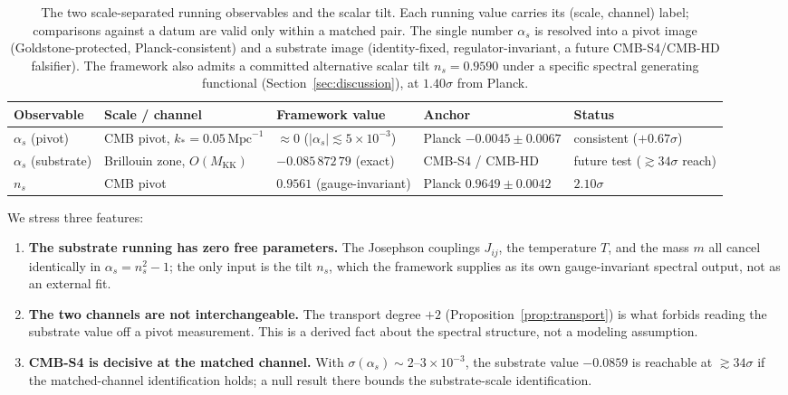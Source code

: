 \documentclass[12pt]{article}
\theoremstyle{definition}
\theoremstyle{remark}
\begin{document}
\begin{table}[h]
\centering
\small
\begin{tabular}{@{}l >{\raggedright\arraybackslash}p{2.9cm} >{\raggedright\arraybackslash}p{3.3cm} >{\raggedright\arraybackslash}p{2.7cm} >{\raggedright\arraybackslash}p{2.4cm}@{}}
\toprule
Observable & Scale / channel & Framework value & Anchor & Status \\
\midrule
$\alpha_s$ (pivot) & CMB pivot, $k_*=0.05\,\mathrm{Mpc}^{-1}$ & $\approx 0$ ($|\alpha_s|\lesssim 5\times10^{-3}$) & Planck $-0.0045 \pm 0.0067$ & consistent ($+0.67\sigma$) \\
$\alpha_s$ (substrate) & Brillouin zone, $O(M_{\mathrm{KK}})$ & $-0.085\,872\,79$ (exact) & CMB-S4 / CMB-HD & future test ($\gtrsim 34\sigma$ reach) \\
$n_s$ & CMB pivot & $0.9561$ (gauge-invariant) & Planck $0.9649 \pm 0.0042$ & $2.10\sigma$ \\
\bottomrule
\end{tabular}
\caption{The two scale-separated running observables and the scalar tilt. Each running value carries its (scale, channel) label; comparisons against a datum are valid only within a matched pair. The single number $\alpha_s$ is resolved into a pivot image (Goldstone-protected, Planck-consistent) and a substrate image (identity-fixed, regulator-invariant, a future CMB-S4/CMB-HD falsifier). The framework also admits a committed alternative scalar tilt $n_s = 0.9590$ under a specific spectral generating functional (Section~\ref{sec:discussion}), at $1.40\sigma$ from Planck.}
\label{tab:two-channel}
\end{table}

We stress three features:

\begin{enumerate}
  \item \textbf{The substrate running has zero free parameters.} The Josephson couplings $J_{ij}$, the temperature $T$, and the mass $m$ all cancel identically in $\alpha_s = n_s^2 - 1$; the only input is the tilt $n_s$, which the framework supplies as its own gauge-invariant spectral output, not as an external fit.
  \item \textbf{The two channels are not interchangeable.} The transport degree $+2$ (Proposition~\ref{prop:transport}) is what forbids reading the substrate value off a pivot measurement. This is a derived fact about the spectral structure, not a modeling assumption.
  \item \textbf{CMB-S4 is decisive at the matched channel.} With $\sigma(\alpha_s) \sim 2\text{--}3 \times 10^{-3}$, the substrate value $-0.0859$ is reachable at $\gtrsim 34\sigma$ if the matched-channel identification holds; a null result there bounds the substrate-scale identification.
\end{enumerate}
\end{document}
